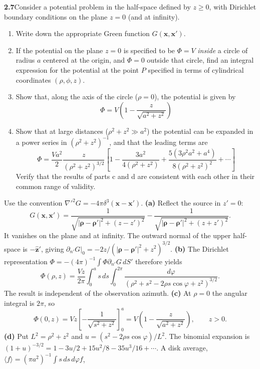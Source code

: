 \par\bigskip
\noindent\textbf{2.7}\quad Consider a potential problem in the half-space defined by $z\geq0$, with Dirichlet boundary conditions on the plane $z=0$ (and at infinity).
\begin{enumerate}
\item[(a)] Write down the appropriate Green function $G(\mathbf{x},\mathbf{x}')$.
\item[(b)] If the potential on the plane $z=0$ is specified to be $\Phi=V$ \emph{inside} a circle of radius $a$ centered at the origin, and $\Phi=0$ outside that circle, find an integral expression for the potential at the point $P$ specified in terms of cylindrical coordinates $(\rho,\phi,z)$.
\item[(c)] Show that, along the axis of the circle ($\rho=0$), the potential is given by
\[
\Phi = V\!\left(1-\frac{z}{\sqrt{a^{2}+z^{2}}}\right)
\]
\item[(d)] Show that at large distances ($\rho^{2}+z^{2}\gg a^{2}$) the potential can be expanded in a power series in $(\rho^{2}+z^{2})^{-1}$, and that the leading terms are
\[
\Phi = \frac{Va^{2}}{2}\frac{z}{(\rho^{2}+z^{2})^{3/2}}\left[1-\frac{3a^{2}}{4(\rho^{2}+z^{2})}+\frac{5(3\rho^{2}a^{2}+a^{4})}{8(\rho^{2}+z^{2})^{2}}+\cdots\right]
\]
Verify that the results of parts c and d are consistent with each other in their common range of validity.
\end{enumerate}
\solution
Use the convention $\nabla'^2G=-4\pi\delta^3(\mathbf x-\mathbf x')$.
\textbf{(a)} Reflect the source in $z'=0$:
\[
\boxed{G(\mathbf x,\mathbf x')=
 \frac1{\sqrt{|\boldsymbol\rho-\boldsymbol\rho'|^2+(z-z')^2}}
-\frac1{\sqrt{|\boldsymbol\rho-\boldsymbol\rho'|^2+(z+z')^2}}.}
\]
It vanishes on the plane and at infinity. The outward normal of
the upper half-space is $-\widehat{\mathbf z}'$, giving
$\partial_{n'}G|_0=-2z/(|\boldsymbol\rho-\boldsymbol\rho'|^2+z^2)^{3/2}$.
\textbf{(b)} The Dirichlet representation
$\Phi=-(4\pi)^{-1}\int\Phi\partial_{n'}G\,dS'$ therefore yields
\[
\boxed{\Phi(\rho,z)=\frac{Vz}{2\pi}
 \int_0^a s\,ds\int_0^{2\pi}
 \frac{d\varphi}{(\rho^2+s^2-2\rho s\cos\varphi+z^2)^{3/2}}.}
\]
The result is independent of the observation azimuth.
\textbf{(c)} At $\rho=0$ the angular integral is $2\pi$, so
\[
\Phi(0,z)=Vz\left[-\frac1{\sqrt{s^2+z^2}}\right]_0^a
=\boxed{V\left(1-\frac z{\sqrt{a^2+z^2}}\right)},\qquad z>0.
\]
\textbf{(d)} Put $L^2=\rho^2+z^2$ and
$u=(s^2-2\rho s\cos\varphi)/L^2$. The binomial expansion is
$(1+u)^{-3/2}=1-3u/2+15u^2/8-35u^3/16+\cdots$.
A disk average, $\langle f\rangle=(\pi a^2)^{-1}\int s\,ds\,d\varphi f$,
